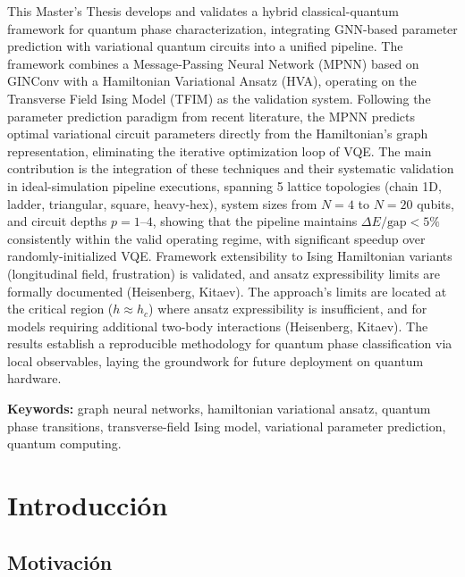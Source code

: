 \documentclass[11pt,a4paper,spanish]{book}
\begin{document}
This Master's Thesis develops and validates a hybrid classical-quantum framework for quantum phase characterization, integrating GNN-based parameter prediction with variational quantum circuits into a unified pipeline. The framework combines a Message-Passing Neural Network (MPNN) based on GINConv with a Hamiltonian Variational Ansatz (HVA), operating on the Transverse Field Ising Model (TFIM) as the validation system. Following the parameter prediction paradigm from recent literature, the MPNN predicts optimal variational circuit parameters directly from the Hamiltonian's graph representation, eliminating the iterative optimization loop of VQE. The main contribution is the integration of these techniques and their systematic validation in ideal-simulation pipeline executions, spanning 5 lattice topologies (chain 1D, ladder, triangular, square, heavy-hex), system sizes from $N=4$ to $N=20$ qubits, and circuit depths $p = 1$--$4$, showing that the pipeline maintains $\Delta E/\text{gap} < 5\%$ consistently within the valid operating regime, with significant speedup over randomly-initialized VQE. Framework extensibility to Ising Hamiltonian variants (longitudinal field, frustration) is validated, and ansatz expressibility limits are formally documented (Heisenberg, Kitaev). The approach's limits are located at the critical region ($h \approx h_c$) where ansatz expressibility is insufficient, and for models requiring additional two-body interactions (Heisenberg, Kitaev). The results establish a reproducible methodology for quantum phase classification via local observables, laying the groundwork for future deployment on quantum hardware.

\vspace{0.5cm}
{\bf Keywords:} graph neural networks, hamiltonian variational ansatz, quantum phase transitions, transverse-field Ising model, variational parameter prediction, quantum computing.

\mainmatter



\chapter{Introducción}

\section{Motivación}
\end{document}
